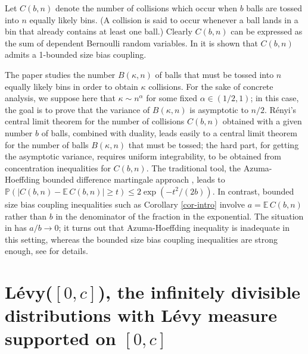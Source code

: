 \documentclass[smallextended,envcountsect]{svjour3}
\begin{document}
\begin{example} \label{example collisions}
Let $C(b,n)$ denote the number of collisions which occur when $b$ balls are tossed into $n$ equally likely bins.  (A collision is said to occur whenever a ball lands in a bin that already contains at least one ball.)  Clearly $C(b,n)$ can be expressed as the sum of dependent Bernoulli random variables.  In \cite[Prop 15]{AGKillian} it is shown that $C(b,n)$ admits a 1-bounded size bias coupling.

The paper \cite{AGKillian} studies the number $B(\kappa,n)$ of balls that must be tossed into $n$ equally likely bins in order to obtain $\kappa$ collisions. For the sake of concrete analysis, we suppose here that  $\kappa \sim n^\alpha$ for some fixed $\alpha \in (1/2,1)$;  in this case, the goal is to prove that the variance of $B(\kappa,n)$ is asymptotic to $n/2$.    R\'enyi's central limit theorem \cite{Renyi}
for the number of collisions $C(b,n)$ obtained with a given number $b$ of balls, combined with duality, leads easily to a central limit theorem for the number of balls $B(\kappa,n)$ that must be tossed;   the hard part, for getting the asymptotic variance, requires uniform integrability, to be obtained from concentration inequalities for $C(b,n)$.
The traditional tool, the Azuma-Hoeffding bounded difference martingale approach \cite{Azuma},  leads to
${\mathbb{P}}( |C(b,n)- {\mathbb{E \,}} C(b,n) | \ge t) \le 2 \exp( -t^2/(2b))$.  In contrast, bounded size bias coupling inequalities such as Corollary \ref{cor-intro} involve $a = {\mathbb{E \,}} C(b,n)$ rather than $b$ in the denominator of the fraction in the exponential.  The situation in \cite{AGKillian} has $a/b \to 0$; it turns out that Azuma-Hoeffding inequality is inadequate in this setting, whereas the bounded size bias coupling inequalities are strong enough, see \cite[Sect 7]{AGKillian} for details.
  \end{example}

\section{L\'evy($[0,c]$), the infinitely divisible distributions with L\'evy measure supported on $[0,c]$} \label{sect inf div}
\end{document}
